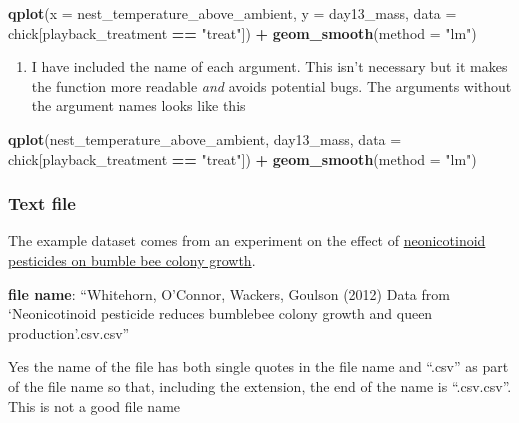 \documentclass[]{book}
\newenvironment{Shaded}{\begin{snugshade}}{\end{snugshade}}
\newcommand{\DataTypeTok}[1]{\textcolor[rgb]{0.13,0.29,0.53}{#1}}
\newcommand{\KeywordTok}[1]{\textcolor[rgb]{0.13,0.29,0.53}{\textbf{#1}}}
\newcommand{\NormalTok}[1]{#1}
\newcommand{\OperatorTok}[1]{\textcolor[rgb]{0.81,0.36,0.00}{\textbf{#1}}}
\newcommand{\StringTok}[1]{\textcolor[rgb]{0.31,0.60,0.02}{#1}}
\providecommand{\tightlist}{%
  \setlength{\itemsep}{0pt}\setlength{\parskip}{0pt}}
\begin{document}
\begin{Shaded}
\begin{Highlighting}[]
\KeywordTok{qplot}\NormalTok{(}\DataTypeTok{x =}\NormalTok{ nest_temperature_above_ambient, }\DataTypeTok{y =}\NormalTok{ day13_mass, }\DataTypeTok{data =}\NormalTok{ chick[playback_treatment }\OperatorTok{==}\StringTok{ "treat"}\NormalTok{]) }\OperatorTok{+}\StringTok{ }\KeywordTok{geom_smooth}\NormalTok{(}\DataTypeTok{method =} \StringTok{"lm"}\NormalTok{)}
\end{Highlighting}
\end{Shaded}

\begin{enumerate}
\def\labelenumi{\arabic{enumi}.}
\setcounter{enumi}{3}
\tightlist
\item
  I have included the name of each argument. This isn't necessary but it makes the function more readable \emph{and} avoids potential bugs. The arguments without the argument names looks like this
\end{enumerate}

\begin{Shaded}
\begin{Highlighting}[]
\KeywordTok{qplot}\NormalTok{(nest_temperature_above_ambient, day13_mass, }\DataTypeTok{data =}\NormalTok{ chick[playback_treatment }\OperatorTok{==}\StringTok{ "treat"}\NormalTok{]) }\OperatorTok{+}\StringTok{ }\KeywordTok{geom_smooth}\NormalTok{(}\DataTypeTok{method =} \StringTok{"lm"}\NormalTok{)}
\end{Highlighting}
\end{Shaded}

\hypertarget{text-file}{%
\subsubsection{Text file}\label{text-file}}

The example dataset comes from an experiment on the effect of \href{http://science.sciencemag.org/content/early/2012/03/28/science.1215025}{neonicotinoid pesticides on bumble bee colony growth}.

\textbf{file name}: ``Whitehorn, O'Connor, Wackers, Goulson (2012) Data from `Neonicotinoid pesticide reduces bumblebee colony growth and queen production'.csv.csv''

Yes the name of the file has both single quotes in the file name and ``.csv'' as part of the file name so that, including the extension, the end of the name is ``.csv.csv''. This is not a good file name
\end{document}
